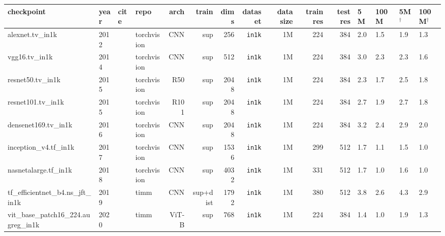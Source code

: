 \setlength{\tabcolsep}{4pt}
\begin{tabular}{llllrrrrrrrRRRR} \toprule
\textbf{checkpoint} & \textbf{year} & \textbf{cite} & \textbf{repo} & \textbf{arch} & \textbf{train} & \textbf{dims} & \textbf{dataset} & \textbf{data size} & \textbf{train res} & \textbf{test res} & \textbf{5M} & \textbf{100M} & \textbf{5M$^\dagger$} & \textbf{100M$^\dagger$} \\ \midrule
alexnet.tv\_in1k                                  & 2012 & \cite{ksh12}             & torchvision & CNN   & sup      & 256  & \texttt{in1k}      & 1M   & 224 & 384 & 2.0  & 1.5 & 1.9   & 1.3  \\
vgg16.tv\_in1k                                    & 2014 & \cite{sz14}              & torchvision & CNN   & sup      & 512  & \texttt{in1k}      & 1M   & 224 & 384 & 3.0  & 2.3 & 2.3   & 1.6  \\
resnet50.tv\_in1k                                 & 2015 & \cite{hzr+16}            & torchvision & R50   & sup      & 2048 & \texttt{in1k}      & 1M   & 224 & 384 & 2.3  & 1.7 & 2.5   & 1.8  \\
resnet101.tv\_in1k                                & 2015 & \cite{hzr+16}            & torchvision & R101  & sup      & 2048 & \texttt{in1k}      & 1M   & 224 & 384 & 2.7  & 1.9 & 2.7   & 1.8  \\
densenet169.tv\_in1k                              & 2016 & \cite{hlv+17}            & torchvision & CNN   & sup      & 2048 & \texttt{in1k}      & 1M   & 224 & 384 & 3.2  & 2.4 & 2.9   & 2.0  \\
inception\_v4.tf\_in1k                            & 2017 & \cite{slj+15}            & torchvision & CNN   & sup      & 1536 & \texttt{in1k}      & 1M   & 299 & 512 & 1.7  & 1.1 & 1.5   & 1.0  \\
nasnetalarge.tf\_in1k                             & 2018 & \cite{zvs+18}            & torchvision & CNN   & sup      & 4032 & \texttt{in1k}      & 1M   & 331 & 512 & 1.7  & 1.0 & 1.6   & 1.0  \\
tf\_efficientnet\_b4.ns\_jft\_in1k                & 2019 & \cite{tl19}              & timm        & CNN   & sup+dist & 1792 & \texttt{in1k}      & 1M   & 380 & 512 & 3.8  & 2.6 & 4.3   & 2.9  \\
vit\_base\_patch16\_224.augreg\_in1k              & 2020 & \cite{dbk+21,vit-augreg} & timm        & ViT-B & sup      & 768  & \texttt{in1k}      & 1M   & 224 & 384 & 1.4  & 1.0 & 1.9   & 1.3  \\

\end{tabular}

